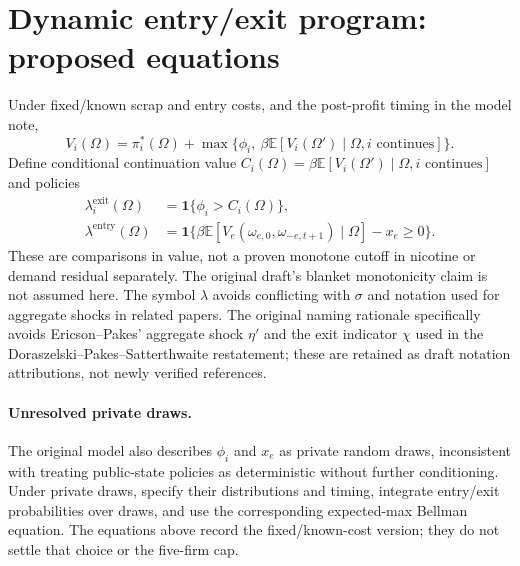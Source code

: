\documentclass[11pt]{article}
\begin{document}
\section{Dynamic entry/exit program: proposed equations}
Under fixed/known scrap and entry costs, and the post-profit timing in the model note,
\begin{equation}\label{eq:bellman}
V_i(\Omega)=\pi_i^*(\Omega)+\max\{\phi_i,\ \beta\mathbb E[V_i(\Omega')\mid\Omega,i\text{ continues}]\}.
\end{equation}
Define conditional continuation value $C_i(\Omega)=\beta\mathbb E[V_i(\Omega')\mid\Omega,i\text{ continues}]$ and policies
\begin{align}
\lambda_i^{\mathrm{exit}}(\Omega)&=\mathbf1\{\phi_i>C_i(\Omega)\},\\
\lambda^{\mathrm{entry}}(\Omega)&=\mathbf1\{\beta\mathbb E[V_e(\omega_{e,0},\omega_{-e,t+1})\mid\Omega]-x_e\geq0\}.
\end{align}
These are comparisons in value, not a proven monotone cutoff in nicotine or demand residual separately. The original draft's blanket monotonicity claim is not assumed here. The symbol $\lambda$ avoids conflicting with $\sigma$ and notation used for aggregate shocks in related papers. The original naming rationale specifically avoids Ericson--Pakes' aggregate shock $\eta'$ and the exit indicator $\chi$ used in the Doraszelski--Pakes--Satterthwaite restatement; these are retained as draft notation attributions, not newly verified references.

\paragraph{Unresolved private draws.} The original model also describes $\phi_i$ and $x_e$ as private random draws, inconsistent with treating public-state policies as deterministic without further conditioning. Under private draws, specify their distributions and timing, integrate entry/exit probabilities over draws, and use the corresponding expected-max Bellman equation. The equations above record the fixed/known-cost version; they do not settle that choice or the five-firm cap.
\end{document}
